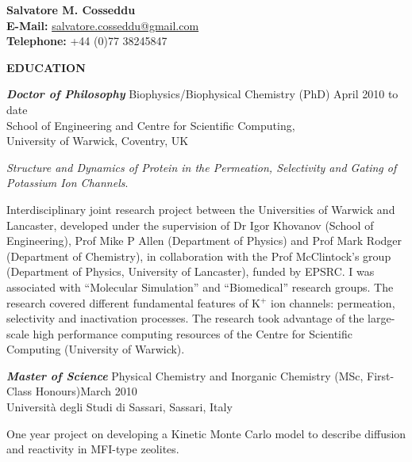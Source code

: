 \documentclass[a4paper,10pt,final]{memoir}
\newcommand{\Sep}{\vspace{1em}}
\newcommand{\SmallSep}{\vspace{0.4em}}
\newcommand{\CVSection}[1]
	{\Large\textbf{#1}\par
	\SmallSep\normalsize\normalfont}
\newcommand{\CVItem}[2]
	{\textit{\textbf{\color{RoyalBlue} #1}} #2}
\begin{document}
\Huge {\bfseries \color{RoyalBlue} Salvatore M. Cosseddu} \\
\small
 \textbf{E-Mail:} \url{salvatore.cosseddu@gmail.com} \\
\textbf{Telephone:} +44 (0)77 38245847
\normalsize\normalfont
\SmallSep
\Sep

\CVSection{EDUCATION}
\CVItem{ Doctor of Philosophy}{Biophysics/Biophysical Chemistry (PhD) \hfill April 2010 to date} \\
School of Engineering and Centre for Scientific Computing, \\
University of Warwick, Coventry, UK %
\begin{description} [style=multiline,leftmargin=2.6cm,font=\normalfont,topsep=0.1cm,itemsep=-3.5pt]
\item [Thesis:] \textit{Structure and Dynamics of Protein in the Permeation, Selectivity
    and Gating of Potassium Ion Channels}.
\item [Research description:] Interdisciplinary joint research project between the
  Universities of Warwick and Lancaster, developed under the supervision of Dr Igor
  Khovanov (School of Engineering), Prof Mike P Allen (Department of Physics) and Prof
  Mark Rodger (Department of Chemistry), in collaboration with the Prof McClintock's group
  (Department of Physics, University of Lancaster), funded by EPSRC. I was associated with
  ``Molecular Simulation'' and ``Biomedical'' research groups. The research covered
  different fundamental features of K$^+$ ion channels: permeation, selectivity and
  inactivation processes. The research took advantage of the large-scale high performance
  computing resources of the Centre for Scientific Computing (University of
  Warwick).%
\end{description}
\SmallSep

\CVItem{Master of Science}{Physical Chemistry and Inorganic Chemistry (MSc, First-Class Honours)\hfill March 2010}\\
Universit\`a degli Studi di Sassari, Sassari, Italy %
\begin{description}[style=multiline,leftmargin=2.6cm,font=\normalfont,topsep=0.1cm,itemsep=-3.5pt]
\item [Final project:] One year project on developing a Kinetic Monte Carlo model to
  describe diffusion and reactivity in MFI-type zeolites.
\end{description}
  \SmallSep
 
\end{document}
